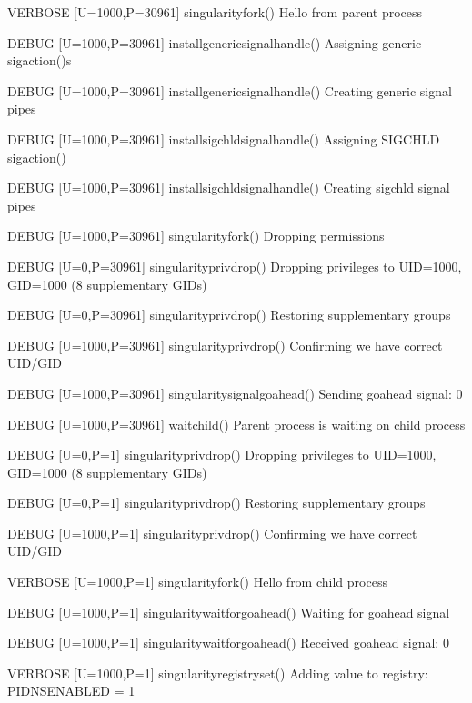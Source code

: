 \documentclass[letterpaper,10pt,english]{sphinxmanual}
\begin{document}
\begin{sphinxVerbatim}[commandchars=\\\{\}]
VERBOSE [U=1000,P=30961]   singularity\PYGZus{}fork()                        Hello from parent process

DEBUG   [U=1000,P=30961]   install\PYGZus{}generic\PYGZus{}signal\PYGZus{}handle()           Assigning generic sigaction()s

DEBUG   [U=1000,P=30961]   install\PYGZus{}generic\PYGZus{}signal\PYGZus{}handle()           Creating generic signal pipes

DEBUG   [U=1000,P=30961]   install\PYGZus{}sigchld\PYGZus{}signal\PYGZus{}handle()           Assigning SIGCHLD sigaction()

DEBUG   [U=1000,P=30961]   install\PYGZus{}sigchld\PYGZus{}signal\PYGZus{}handle()           Creating sigchld signal pipes

DEBUG   [U=1000,P=30961]   singularity\PYGZus{}fork()                        Dropping permissions

DEBUG   [U=0,P=30961]      singularity\PYGZus{}priv\PYGZus{}drop()                   Dropping privileges to UID=1000, GID=1000 (8 supplementary GIDs)

DEBUG   [U=0,P=30961]      singularity\PYGZus{}priv\PYGZus{}drop()                   Restoring supplementary groups

DEBUG   [U=1000,P=30961]   singularity\PYGZus{}priv\PYGZus{}drop()                   Confirming we have correct UID/GID

DEBUG   [U=1000,P=30961]   singularity\PYGZus{}signal\PYGZus{}go\PYGZus{}ahead()             Sending go\PYGZhy{}ahead signal: 0

DEBUG   [U=1000,P=30961]   wait\PYGZus{}child()                              Parent process is waiting on child process

DEBUG   [U=0,P=1]          singularity\PYGZus{}priv\PYGZus{}drop()                   Dropping privileges to UID=1000, GID=1000 (8 supplementary GIDs)

DEBUG   [U=0,P=1]          singularity\PYGZus{}priv\PYGZus{}drop()                   Restoring supplementary groups

DEBUG   [U=1000,P=1]       singularity\PYGZus{}priv\PYGZus{}drop()                   Confirming we have correct UID/GID

VERBOSE [U=1000,P=1]       singularity\PYGZus{}fork()                        Hello from child process

DEBUG   [U=1000,P=1]       singularity\PYGZus{}wait\PYGZus{}for\PYGZus{}go\PYGZus{}ahead()           Waiting for go\PYGZhy{}ahead signal

DEBUG   [U=1000,P=1]       singularity\PYGZus{}wait\PYGZus{}for\PYGZus{}go\PYGZus{}ahead()           Received go\PYGZhy{}ahead signal: 0

VERBOSE [U=1000,P=1]       singularity\PYGZus{}registry\PYGZus{}set()                Adding value to registry: \PYGZsq{}PIDNS\PYGZus{}ENABLED\PYGZsq{} = \PYGZsq{}1\PYGZsq{}
\end{sphinxVerbatim}
\end{document}
